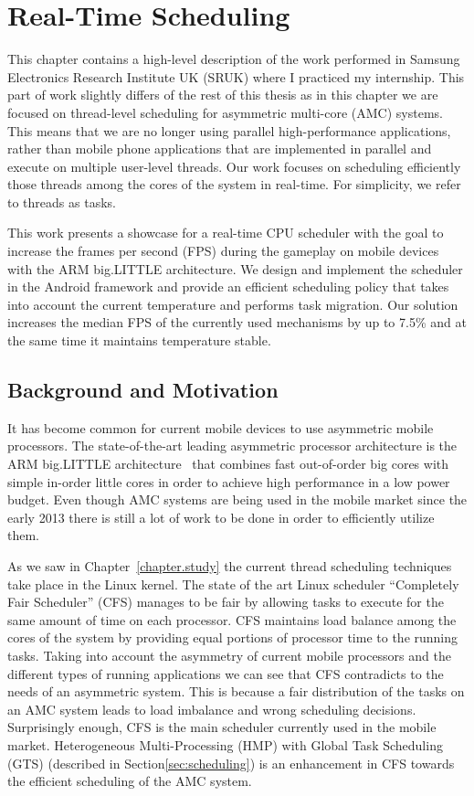 \chapter{Real-Time Scheduling}
\label{chapter.RTS}
This chapter contains a high-level description of the work performed in Samsung Electronics Research Institute UK (SRUK) where I practiced my internship.
This part of work slightly differs of the rest of this thesis as in this chapter we are focused on thread-level scheduling for asymmetric multi-core (AMC) systems.
This means that we are no longer using parallel high-performance applications, rather than mobile phone applications that are implemented in parallel and execute on multiple user-level threads.
Our work focuses on scheduling efficiently those threads among the cores of the system in real-time.
For simplicity, we refer to threads as tasks.

This work presents a showcase for a real-time CPU scheduler with the goal to increase the frames per second (FPS) during the gameplay on mobile devices with the ARM big.LITTLE architecture. 
We design and implement the scheduler in the Android framework and provide an efficient scheduling policy that takes into account the current temperature and performs task migration. 
Our solution increases the median FPS of the currently used mechanisms by up to 7.5\% and at the same time it maintains temperature stable. 
\newpage

\section{Background and Motivation}
It has become common for current mobile devices to use asymmetric mobile processors. 
The state-of-the-art leading asymmetric processor architecture is the ARM big.LITTLE architecture~\cite{Greenhalgh2011} that combines fast out-of-order big cores with simple in-order little cores in order to achieve high performance in a low power budget. 
Even though AMC systems are being used in the mobile market since the early 2013 there is still a lot of work to be done in order to efficiently utilize them.

As we saw in Chapter~\ref{chapter.study} the current thread scheduling techniques take place in the Linux kernel.
The state of the art Linux scheduler “Completely Fair Scheduler” (CFS)  manages to be fair by allowing tasks to execute for the same amount of time on each processor. 
CFS maintains load balance among the cores of the system by providing equal portions of processor time to the running tasks. 
Taking into account the asymmetry of current mobile processors and the different types of running applications we can see that CFS contradicts to the needs of an asymmetric system.
This is because a fair distribution of the tasks on an AMC system leads to load imbalance and wrong scheduling decisions. 
Surprisingly enough, CFS is the main scheduler currently used in the mobile market.
Heterogeneous Multi-Processing (HMP) with Global Task Scheduling (GTS) (described in Section\ref{sec:scheduling}) is an enhancement in CFS towards the efficient scheduling of the AMC system. 

